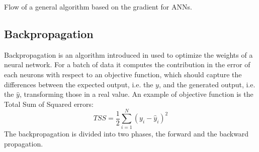 \begin{algorithm}
	\begin{algorithmic}[1]
		\Repeat
				\EndFor
			\EndFor
	\end{algorithmic}
	\caption{Flow of a general algorithm based on the gradient for ANNs.}\label{alg:ann-training}
\end{algorithm}

\subsection{Backpropagation}\label{subsec:backpropagation}
Backpropagation is an algorithm introduced in \cite{RUM:1986} used to optimize the weights of a neural network. For a batch of data it computes the contribution in the error of each neurons with respect to an objective function, which should capture the differences between the expected output, i.e. the $y$, and the generated output, i.e. the $\hat{y}$, transforming those in a real value. An example of objective function is the Total Sum of Squared errors:
\begin{equation}
	TSS = \frac{1}{2}\sum\limits_{i=1}^{N}(y_i - \hat{y}_{i})^{2}
\end{equation}\label{eq:tss}
The backpropagation is divided into two phases, the forward and the backward propagation.

